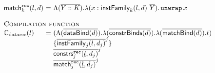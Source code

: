 \begin{figure}[!t]
\begin{displaymath}
\begin{array}{l@{\ }l@{\ }l}
  \matchRec{l}{d}{k}
  &=& \Lambda (\seq{Y::K}). \lambda (x : \dtInstFinal{l}{d}{k}\ \seq{Y}) . \unwrap x\\
  \\
  \multicolumn{3}{l}{\textsc{Compilation function}}\\
  \compiledatarec(l)
  &=&(\Lambda (\seq{\dataBind{d}}) . \lambda (\seq{\constrBinds{d}}) . \lambda (\seq{\matchBind{d}}) . t)\\
  &&\{ \seq{\dtInstFinal{l}{d_j}{j}}^j \} \\
  &&\seq{\constrsRec{\fixed{l}}{d_j}{j}}^j\\
  &&\seq{\matchRec{\fixed{l}}{d_j}{j}}^j
  \end{array}
  \end{displaymath}

  \label{fig:compile-recursive-datatypes}
\end{figure}

